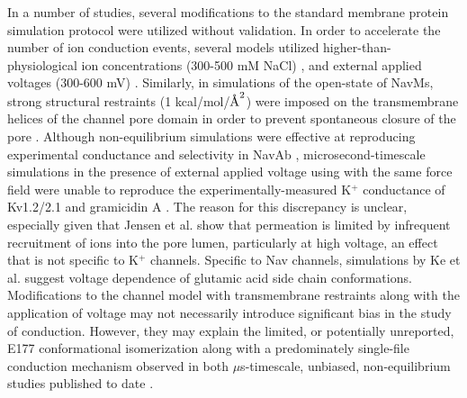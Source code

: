 \begin{refsection}
In a number of studies, several modifications to the standard membrane protein simulation protocol \cite{Kandt:2007wz} were utilized without validation.  In order to accelerate the number of ion conduction events, several models utilized higher-than-physiological ion concentrations (300-500 mM NaCl) \cite{Corry:2012ge,Ke:2014fy,Ulmschneider:2013da}, and external applied voltages (300-600 mV) \cite{Ulmschneider:2013da,Ke:2014fy,Stock:2013cg}.  Similarly, in simulations of the open-state of NavMs, strong structural restraints (1 kcal/mol/$\textup{\AA}^{2}$) were imposed on the transmembrane helices of the channel pore domain in order to prevent spontaneous closure of the pore \cite{Ulmschneider:2013da,Ke:2014fy}.  Although non-equilibrium simulations were effective at reproducing experimental conductance and selectivity in NavAb \cite{Ulmschneider:2013da,Ke:2014fy}, microsecond-timescale simulations in the presence of external applied voltage using with the same force field were unable to reproduce the experimentally-measured K$^{+}$ conductance of Kv1.2/2.1 and gramicidin A \cite{Jensen:2013gn}.  The reason for this discrepancy is unclear, especially given that Jensen et al. show that permeation is limited by infrequent recruitment of ions into the pore lumen, particularly at high voltage, an effect that is not specific to K$^{+}$ channels.  Specific to Nav channels, simulations by Ke et al. \cite{Ke:2014fy} suggest voltage dependence of glutamic acid side chain conformations.  Modifications to the channel model with transmembrane restraints along with the application of voltage may not necessarily introduce significant bias in the study of conduction. However, they may explain the limited, or potentially unreported, E177 conformational isomerization along with a predominately single-file conduction mechanism observed in both $\mu$s-timescale, unbiased, non-equilibrium studies published to date \cite{Ulmschneider:2013da,Ke:2014fy}.

\end{refsection}
